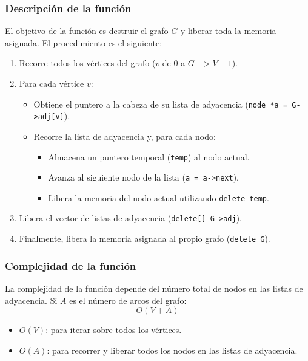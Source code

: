 \documentclass{article}
\begin{document}
        \subsubsection*{Descripción de la función}
            El objetivo de la función es destruir el grafo \( G \) y liberar toda la memoria asignada. El procedimiento es el siguiente:
            \begin{enumerate}
                \item Recorre todos los vértices del grafo (\( v \) de \( 0 \) a \( G->V - 1 \)).
                \item Para cada vértice \( v \):
                \begin{itemize}
                    \item Obtiene el puntero a la cabeza de su lista de adyacencia (\texttt{node *a = G->adj[v]}).
                    \item Recorre la lista de adyacencia y, para cada nodo:
                    \begin{itemize}
                        \item Almacena un puntero temporal (\texttt{temp}) al nodo actual.
                        \item Avanza al siguiente nodo de la lista (\texttt{a = a->next}).
                        \item Libera la memoria del nodo actual utilizando \texttt{delete temp}.
                    \end{itemize}
                \end{itemize}
                \item Libera el vector de listas de adyacencia (\texttt{delete[] G->adj}).
                \item Finalmente, libera la memoria asignada al propio grafo (\texttt{delete G}).
            \end{enumerate}
            
        \subsubsection*{Complejidad de la función}
            La complejidad de la función depende del número total de nodos en las listas de adyacencia. Si \( A \) es el número de arcos del grafo:
            \[
            O(V + A)
            \]
            \begin{itemize}
                \item \( O(V) \): para iterar sobre todos los vértices.
                \item \( O(A) \): para recorrer y liberar todos los nodos en las listas de adyacencia.
            \end{itemize}
            
\end{document}
